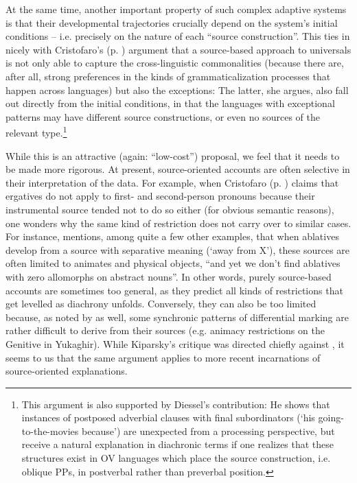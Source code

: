\documentclass[output=paper]{langsci/langscibook}
\begin{document}
At the same time, another important property of such complex adaptive systems is that their developmental trajectories crucially depend on the system’s initial conditions – i.e. precisely on the nature of each “source construction”. This ties in nicely with Cristofaro’s (p. \pageref{p:cristofaro:commonalitiesexceptions}) argument that a source-based approach to universals is not only able to capture the cross-linguistic commonalities (because there are, after all, strong preferences in the kinds of grammaticalization processes that happen across languages) but also the exceptions: The latter, she argues, also fall out directly from the initial conditions, in that the languages with exceptional patterns may have different source constructions, or even no sources of the relevant type.\footnote{This argument is also supported by Diessel’s contribution: He shows that instances of postposed adverbial clauses with final subordinators (‘his going-to-the-movies because’) are unexpected from a processing perspective, but receive a natural explanation in diachronic terms if one realizes that these structures exist in OV languages which place the source construction, i.e. oblique PPs, in postverbal rather than preverbal position.}  

While this is an attractive (again: “low-cost”) proposal, we feel that it needs to be made more rigorous. At present, source-oriented accounts are often selective in their interpretation of the data. For example, when Cristofaro (p. \pageref{p:cristofaro:ergatives}) claims that ergatives do not apply to first- and second-person pronouns because their instrumental source tended not to do so either (for obvious semantic reasons), one wonders why the same kind of restriction does not carry over to similar cases. For instance, \citet[36]{Kiparsky2008} mentions, among quite a few other examples, that when ablatives develop from a source with separative meaning (‘away from X’), these sources are often limited to animates and physical objects, “and yet we don't find ablatives with zero allomorphs on abstract nouns”. In other words, purely source-based accounts are sometimes too general, as they predict all kinds of restrictions that get levelled as diachrony unfolds. Conversely, they can also be too limited because, as noted by \citet{Kiparsky2008} as well, some synchronic patterns of differential marking are rather difficult to derive from their sources (e.g. animacy restrictions on the Genitive in Yukaghir). While Kiparsky’s critique was directed chiefly against \citet{Garrett1990}, it seems to us that the same argument applies to more recent incarnations of source-oriented explanations.
\end{document}
